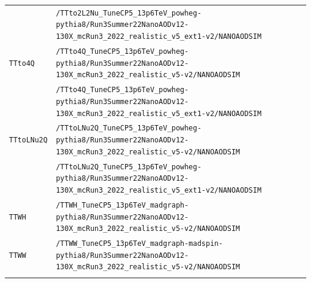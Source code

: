 \begin{longtable}{@{}>{\RaggedRight\arraybackslash}p{} >{\RaggedRight\arraybackslash}p{}@{}}
 & \texttt{/\allowbreak{}TTto2L2Nu\_\allowbreak{}TuneCP5\_\allowbreak{}13p6TeV\_\allowbreak{}powheg-\allowbreak{}pythia8/\allowbreak{}Run3Summer22NanoAODv12-\allowbreak{}130X\_\allowbreak{}mcRun3\_\allowbreak{}2022\_\allowbreak{}realistic\_\allowbreak{}v5\_\allowbreak{}ext1-\allowbreak{}v2/\allowbreak{}NANOAODSIM} \\
\addlinespace[2pt]
\texttt{TTto4Q} & \texttt{/\allowbreak{}TTto4Q\_\allowbreak{}TuneCP5\_\allowbreak{}13p6TeV\_\allowbreak{}powheg-\allowbreak{}pythia8/\allowbreak{}Run3Summer22NanoAODv12-\allowbreak{}130X\_\allowbreak{}mcRun3\_\allowbreak{}2022\_\allowbreak{}realistic\_\allowbreak{}v5-\allowbreak{}v2/\allowbreak{}NANOAODSIM} \\
 & \texttt{/\allowbreak{}TTto4Q\_\allowbreak{}TuneCP5\_\allowbreak{}13p6TeV\_\allowbreak{}powheg-\allowbreak{}pythia8/\allowbreak{}Run3Summer22NanoAODv12-\allowbreak{}130X\_\allowbreak{}mcRun3\_\allowbreak{}2022\_\allowbreak{}realistic\_\allowbreak{}v5\_\allowbreak{}ext1-\allowbreak{}v2/\allowbreak{}NANOAODSIM} \\
\addlinespace[2pt]
\texttt{TTtoLNu2Q} & \texttt{/\allowbreak{}TTtoLNu2Q\_\allowbreak{}TuneCP5\_\allowbreak{}13p6TeV\_\allowbreak{}powheg-\allowbreak{}pythia8/\allowbreak{}Run3Summer22NanoAODv12-\allowbreak{}130X\_\allowbreak{}mcRun3\_\allowbreak{}2022\_\allowbreak{}realistic\_\allowbreak{}v5-\allowbreak{}v2/\allowbreak{}NANOAODSIM} \\
 & \texttt{/\allowbreak{}TTtoLNu2Q\_\allowbreak{}TuneCP5\_\allowbreak{}13p6TeV\_\allowbreak{}powheg-\allowbreak{}pythia8/\allowbreak{}Run3Summer22NanoAODv12-\allowbreak{}130X\_\allowbreak{}mcRun3\_\allowbreak{}2022\_\allowbreak{}realistic\_\allowbreak{}v5\_\allowbreak{}ext1-\allowbreak{}v2/\allowbreak{}NANOAODSIM} \\
\addlinespace[2pt]
\texttt{TTWH} & \texttt{/\allowbreak{}TTWH\_\allowbreak{}TuneCP5\_\allowbreak{}13p6TeV\_\allowbreak{}madgraph-\allowbreak{}pythia8/\allowbreak{}Run3Summer22NanoAODv12-\allowbreak{}130X\_\allowbreak{}mcRun3\_\allowbreak{}2022\_\allowbreak{}realistic\_\allowbreak{}v5-\allowbreak{}v2/\allowbreak{}NANOAODSIM} \\
\addlinespace[2pt]
\texttt{TTWW} & \texttt{/\allowbreak{}TTWW\_\allowbreak{}TuneCP5\_\allowbreak{}13p6TeV\_\allowbreak{}madgraph-\allowbreak{}madspin-\allowbreak{}pythia8/\allowbreak{}Run3Summer22NanoAODv12-\allowbreak{}130X\_\allowbreak{}mcRun3\_\allowbreak{}2022\_\allowbreak{}realistic\_\allowbreak{}v5-\allowbreak{}v2/\allowbreak{}NANOAODSIM} \\
\addlinespace[2pt]

\end{longtable}
